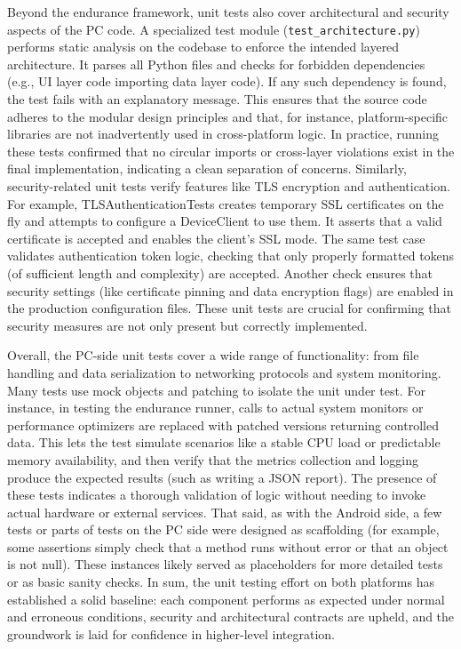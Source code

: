 \documentclass[11pt,a4paper]{report}
\begin{document}
Beyond the endurance framework, unit tests also cover architectural and security aspects of the PC code. A specialized test module (\texttt{test\_architecture.py}) performs static analysis on the codebase to enforce the intended layered architecture. It parses all Python files and checks for forbidden dependencies (e.g., UI layer code importing data layer code). If any such dependency is found, the test fails with an explanatory message. This ensures that the source code adheres to the modular design principles and that, for instance, platform-specific libraries are not inadvertently used in cross-platform logic. In practice, running these tests confirmed that no circular imports or cross-layer violations exist in the final implementation, indicating a clean separation of concerns. Similarly, security-related unit tests verify features like TLS encryption and authentication. For example, TLSAuthenticationTests creates temporary SSL certificates on the fly and attempts to configure a DeviceClient to use them. It asserts that a valid certificate is accepted and enables the client's SSL mode. The same test case validates authentication token logic, checking that only properly formatted tokens (of sufficient length and complexity) are accepted. Another check ensures that security settings (like certificate pinning and data encryption flags) are enabled in the production configuration files. These unit tests are crucial for confirming that security measures are not only present but correctly implemented.

Overall, the PC-side unit tests cover a wide range of functionality: from file handling and data serialization to networking protocols and system monitoring. Many tests use mock objects and patching to isolate the unit under test. For instance, in testing the endurance runner, calls to actual system monitors or performance optimizers are replaced with patched versions returning controlled data. This lets the test simulate scenarios like a stable CPU load or predictable memory availability, and then verify that the metrics collection and logging produce the expected results (such as writing a JSON report). The presence of these tests indicates a thorough validation of logic without needing to invoke actual hardware or external services. That said, as with the Android side, a few tests or parts of tests on the PC side were designed as scaffolding (for example, some assertions simply check that a method runs without error or that an object is not null). These instances likely served as placeholders for more detailed tests or as basic sanity checks. In sum, the unit testing effort on both platforms has established a solid baseline: each component performs as expected under normal and erroneous conditions, security and architectural contracts are upheld, and the groundwork is laid for confidence in higher-level integration.
\end{document}
